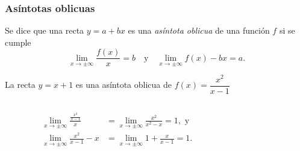 \begin{frame}
\frametitle{Asíntotas oblicuas}
\begin{definicion}
Se dice que una recta $y=a+bx$ es una \emph{asíntota oblicua} de una función $f$ si se cumple
\[
\lim_{x\rightarrow \pm\infty}\frac{f(x)}{x}=b \quad \textrm{y} \quad \lim_{x\rightarrow \pm\infty}f(x)-bx=a.
\]
\end{definicion}

 La recta $y=x+1$ es una asíntota oblicua de $f(x)=\dfrac{x^2}{x-1}$
\begin{columns}
\begin{column}{0.5\textwidth}
\begin{align*}
\lim_{x\rightarrow \pm\infty}\frac{\frac{x^2}{x-1}}{x}&=
\lim_{x\rightarrow \pm\infty}\frac{x^2}{x^2-x} = 1, \textrm{ y}\\
\lim_{x\rightarrow \pm\infty}\frac{x^2}{x-1}-x &=
\lim_{x\rightarrow \pm\infty}1+\frac{x}{x-1} = 1.
\end{align*}
\end{column}
\begin{column}{0.5\textwidth}
\begin{center}
\scalebox{1}{}
\end{center}
\end{column}
\end{columns}
\end{frame}



